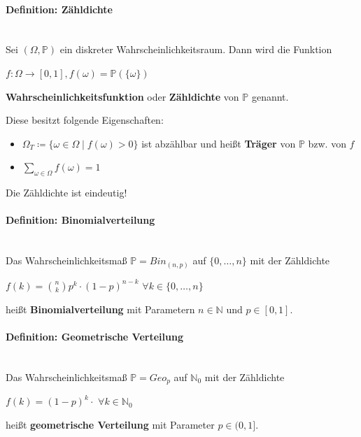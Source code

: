 \documentclass[parskip=full,12pt,a4paper,titlepage]{scrartcl}
\newcommand{\N}{\mathbb{N}}
\newcommand{\PP}{\mathbb{P}}
\newcommand{\pg}[1]{\paragraph{#1}\mbox{}\\}
\newenvironment{tightcenter}{%
	\setlength\topsep{0pt}
	\setlength\parskip{0pt}
	\begin{center}
	}{%
	\end{center}
}
\begin{document}
	\pg{Definition: Zähldichte}
	Sei $(\Omega,\PP)$ ein diskreter Wahrscheinlichkeitsraum.
	Dann wird die Funktion\\
	\begin{tightcenter}
		$f:\Omega\rightarrow[0,1], f(\omega)=\PP(\{\omega\})$
	\end{tightcenter}
	\textbf{Wahrscheinlichkeitsfunktion} oder \textbf{Zähldichte} von $\PP$ genannt. 
	
	\pagebreak
	Diese besitzt folgende Eigenschaften:
	\begin{itemize}
		\item $\Omega_T\coloneqq\{\omega\in\Omega\mid f(\omega)>0\}$ ist abzählbar und heißt \textbf{Träger} von $\PP$ bzw. von $f$
		\item $\sum\limits_{\omega\in\Omega}f(\omega)=1$
	\end{itemize}
	Die Zähldichte ist eindeutig!
	
	\pg{Definition: Binomialverteilung}
	Das Wahrscheinlichkeitsmaß $\PP=Bin_{(n,p)}$ auf $\{0,\ldots,n\}$ mit der Zähldichte\\
	\begin{tightcenter}
		$f(k)=\binom{n}{k}p^k\cdot(1-p)^{n-k}$ \qquad$\forall k\in\{0,\ldots,n\}$
	\end{tightcenter}
	heißt \textbf{Binomialverteilung} mit Parametern $n\in\N$ und $p\in[0,1]$.
	
	\pg{Definition: Geometrische Verteilung}
	Das Wahrscheinlichkeitsmaß $\PP=Geo_p$ auf $\N_0$ mit der Zähldichte\\
	\begin{tightcenter}
		$f(k)=(1-p)^k\cdotp$ \qquad$\forall k\in\N_0$
	\end{tightcenter}
	heißt \textbf{geometrische Verteilung} mit Parameter $p\in(0,1]$.
\end{document}
